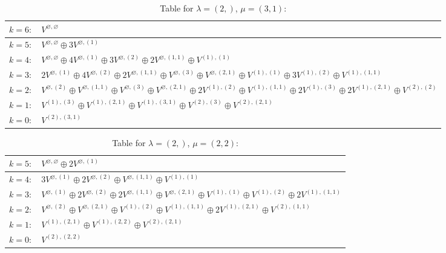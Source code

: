 \documentclass[a4paper,12pt]{article}
\begin{document}
\renewcommand{\arraystretch}{1.6} 
\begin{table}[H]
\centering
\caption{Table for $\lambda = (2,)$, $\mu = (3, 1)$:}
\begin{tabular}{|>{\centering\arraybackslash}p{15cm}|}
\hline
 $k = 6: \quad V^{\varnothing, \varnothing} $ \\ \hline
 $k = 5: \quad V^{\varnothing, \varnothing} \oplus 3 V^{\varnothing, (1)} $ \\ \hline
 $k = 4: \quad V^{\varnothing, \varnothing} \oplus 4 V^{\varnothing, (1)} \oplus 3 V^{\varnothing, (2)} \oplus 2 V^{\varnothing, (1, 1)} \oplus V^{(1), (1)} $ \\ \hline
 $k = 3: \quad 2 V^{\varnothing, (1)} \oplus 4 V^{\varnothing, (2)} \oplus 2 V^{\varnothing, (1, 1)} \oplus V^{\varnothing, (3)} \oplus V^{\varnothing, (2, 1)} \oplus V^{(1), (1)} \oplus 3 V^{(1), (2)} \oplus V^{(1), (1, 1)} $ \\ \hline
 $k = 2: \quad V^{\varnothing, (2)} \oplus V^{\varnothing, (1, 1)} \oplus V^{\varnothing, (3)} \oplus V^{\varnothing, (2, 1)} \oplus 2 V^{(1), (2)} \oplus V^{(1), (1, 1)} \oplus 2 V^{(1), (3)} \oplus 2 V^{(1), (2, 1)} \oplus V^{(2), (2)} $ \\ \hline
 $k = 1: \quad V^{(1), (3)} \oplus V^{(1), (2, 1)} \oplus V^{(1), (3, 1)} \oplus V^{(2), (3)} \oplus V^{(2), (2, 1)} $ \\ \hline
 $k = 0: \quad V^{(2), (3, 1)} $ \\ \hline
\end{tabular}
\end{table}

\renewcommand{\arraystretch}{1.6} 
\begin{table}[H]
\centering
\caption{Table for $\lambda = (2,)$, $\mu = (2, 2)$:}
\begin{tabular}{|>{\centering\arraybackslash}p{15cm}|}
\hline
 $k = 5: \quad V^{\varnothing, \varnothing} \oplus 2 V^{\varnothing, (1)} $ \\ \hline
 $k = 4: \quad 3 V^{\varnothing, (1)} \oplus 2 V^{\varnothing, (2)} \oplus V^{\varnothing, (1, 1)} \oplus V^{(1), (1)} $ \\ \hline
 $k = 3: \quad V^{\varnothing, (1)} \oplus 2 V^{\varnothing, (2)} \oplus 2 V^{\varnothing, (1, 1)} \oplus V^{\varnothing, (2, 1)} \oplus V^{(1), (1)} \oplus V^{(1), (2)} \oplus 2 V^{(1), (1, 1)} $ \\ \hline
 $k = 2: \quad V^{\varnothing, (2)} \oplus V^{\varnothing, (2, 1)} \oplus V^{(1), (2)} \oplus V^{(1), (1, 1)} \oplus 2 V^{(1), (2, 1)} \oplus V^{(2), (1, 1)} $ \\ \hline
 $k = 1: \quad V^{(1), (2, 1)} \oplus V^{(1), (2, 2)} \oplus V^{(2), (2, 1)} $ \\ \hline
 $k = 0: \quad V^{(2), (2, 2)} $ \\ \hline
\end{tabular}
\end{table}
\end{document}

